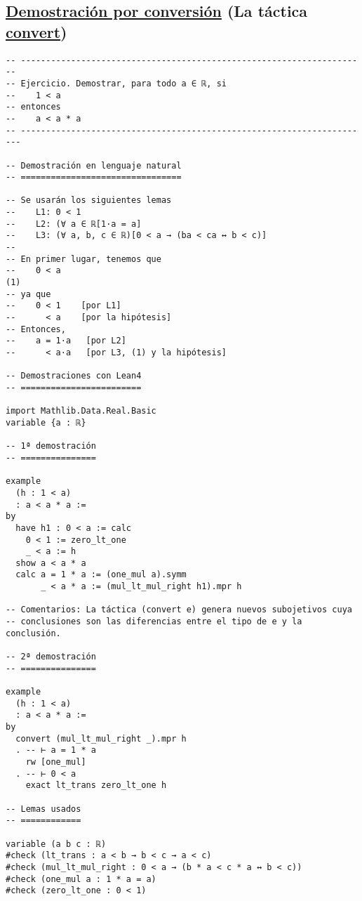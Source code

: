 \subsection{\href{./src/Logica/Demostracion\_por\_conversion.lean}{Demostración por conversión} (La táctica \href{https://bit.ly/2Bgujiu}{convert})}
\label{sec:orgfe63e41}
\begin{verbatim}
-- ---------------------------------------------------------------------
-- Ejercicio. Demostrar, para todo a ∈ ℝ, si
--    1 < a
-- entonces
--    a < a * a
-- ----------------------------------------------------------------------

-- Demostración en lenguaje natural
-- ================================

-- Se usarán los siguientes lemas
--    L1: 0 < 1
--    L2: (∀ a ∈ ℝ[1·a = a]
--    L3: (∀ a, b, c ∈ ℝ)[0 < a → (ba < ca ↔ b < c)]
--
-- En primer lugar, tenemos que
--    0 < a                                                          (1)
-- ya que
--    0 < 1    [por L1]
--      < a    [por la hipótesis]
-- Entonces,
--    a = 1·a   [por L2]
--      < a·a   [por L3, (1) y la hipótesis]

-- Demostraciones con Lean4
-- ========================

import Mathlib.Data.Real.Basic
variable {a : ℝ}

-- 1ª demostración
-- ===============

example
  (h : 1 < a)
  : a < a * a :=
by
  have h1 : 0 < a := calc
    0 < 1 := zero_lt_one
    _ < a := h
  show a < a * a
  calc a = 1 * a := (one_mul a).symm
       _ < a * a := (mul_lt_mul_right h1).mpr h

-- Comentarios: La táctica (convert e) genera nuevos subojetivos cuya
-- conclusiones son las diferencias entre el tipo de e y la conclusión.

-- 2ª demostración
-- ===============

example
  (h : 1 < a)
  : a < a * a :=
by
  convert (mul_lt_mul_right _).mpr h
  . -- ⊢ a = 1 * a
    rw [one_mul]
  . -- ⊢ 0 < a
    exact lt_trans zero_lt_one h

-- Lemas usados
-- ============

variable (a b c : ℝ)
#check (lt_trans : a < b → b < c → a < c)
#check (mul_lt_mul_right : 0 < a → (b * a < c * a ↔ b < c))
#check (one_mul a : 1 * a = a)
#check (zero_lt_one : 0 < 1)
\end{verbatim}

